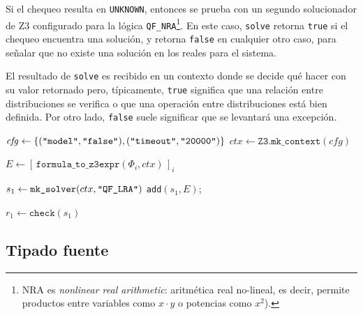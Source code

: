 Si el chequeo resulta en \verb|UNKNOWN|, entonces se prueba con un
segundo solucionador de Z3 configurado para la lógica
\texttt{QF\_NRA}\footnote{NRA es \emph{nonlinear real
    arithmetic}: aritmética real no-lineal, es decir, permite productos entre variables como $x\cdot y$
  o potencias como $x^2$).}.  En este caso, \verb|solve| retorna
\verb|true| si el chequeo encuentra una solución, y retorna
\verb|false| en cualquier otro caso, para señalar que no existe una
solución en los reales para el sistema.


El resultado de \verb|solve| es recibido en un contexto donde se decide
qué hacer con su valor retornado pero, típicamente, \verb|true|
significa que una relación entre distribuciones se verifica o que una
operación entre distribuciones está bien definida. Por otro lado,
\verb|false| suele significar que se levantará una excepción.

\begin{algorithm}[H]
\caption{\texttt{solve}}
\label{alg:solve}

$\mathit{cfg} \leftarrow \{(\texttt{\strquote{model}},\texttt{\strquote{false}}),(\texttt{\strquote{timeout}},\texttt{\strquote{20000}})\}$
$ctx \leftarrow \texttt{Z3.mk\_context}(\mathit{cfg})$

$E \leftarrow [\,\texttt{formula\_to\_z3expr}(\Phi_i,ctx)\,]_i$

$s_1 \leftarrow \texttt{mk\_solver}(ctx,\texttt{\strquote{QF\_LRA}})$
\texttt{add}$(s_1, E)$;

$r_1 \leftarrow \texttt{check}(s_1)$\;

\end{algorithm}

\subsection{Tipado fuente}
\label{sec:impl-rutinas-tc-fuente}

